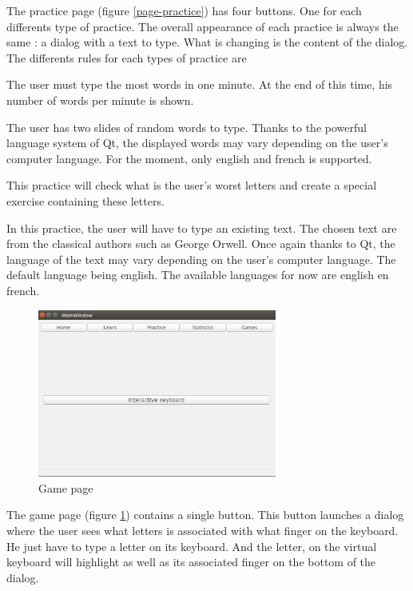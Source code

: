 The practice page  (figure \ref{page-practice}) has four buttons. One for each differents type of practice. The overall appearance of each practice is always the same : a dialog with a text to type. What is changing is the content of the dialog.\\
The differents rules for each types of practice are 
\begin{description}[align=left]
	\item[Against time/Race :] The user must type the most words in one minute. At the end of this time, his number of words per minute is shown.
	\item[Normal :] The user has two slides of random words to type. Thanks to the powerful language system of Qt, the displayed words may vary depending on the user's computer language. For the moment, only english and french is supported.
	\item[Improve :] This practice will check what is the user's worst letters and create a special exercise containing these letters.
	\item[Text :] In this practice, the user will have to type an existing text. The chosen text are from the classical authors such as George Orwell. Once again thanks to Qt, the language of the text may vary depending on the user's computer language. The default language being english. The available languages for now are english en french.
\end{description}


\begin{figure}[H]
	\centering
	\includegraphics[width=0.7\textwidth]{images/page-games.png}
	 \caption{Game page}
	 \label{page-game}
\end{figure}

The game page (figure \ref{page-game}) contains a single button. This button launches a dialog where the user sees what letters is associated with what finger on the keyboard. He just have to type a letter on its keyboard. And the letter, on the virtual keyboard will highlight as well as its associated finger on the bottom of the dialog.

